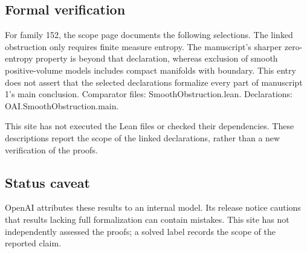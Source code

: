 \documentclass[11pt]{article}
\begin{document}
\subsection{Formal verification}
For family 152, the scope page documents the following selections. The linked obstruction only requires finite measure entropy. The manuscript's sharper zero-entropy property is beyond that declaration, whereas exclusion of smooth positive-volume models includes compact manifolds with boundary. This entry does not assert that the selected declarations formalize every part of manuscript 1's main conclusion. Comparator files: SmoothObstruction.lean. Declarations: OAI.SmoothObstruction.main.

This site has not executed the Lean files or checked their dependencies. These descriptions report the scope of the linked declarations, rather than a new verification of the proofs.

\subsection{Status caveat}
OpenAI attributes these results to an internal model. Its release notice cautions that results lacking full formalization can contain mistakes. This site has not independently assessed the proofs; a solved label records the scope of the reported claim.
\end{document}
